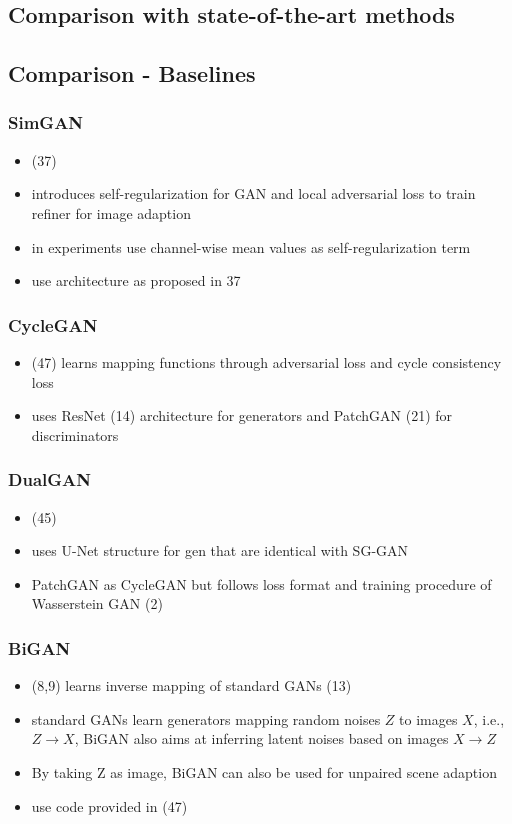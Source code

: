 \documentclass[]{article}
\begin{document}
\subsection{Comparison with state-of-the-art methods}
\subsection{Comparison - Baselines}
\subsubsection{SimGAN}
\begin{itemize}
	\item (37)
	\item introduces self-regularization for GAN and local adversarial loss to train refiner for image adaption
	\item in experiments use channel-wise mean values as self-regularization term
	\item use architecture as proposed in 37
\end{itemize}

\subsubsection{CycleGAN}
\begin{itemize}
	\item (47) learns mapping functions through adversarial loss and cycle consistency loss
	\item uses ResNet (14) architecture for generators and PatchGAN (21) for discriminators
\end{itemize}

\subsubsection{DualGAN}
\begin{itemize}
	\item (45)
	\item uses U-Net structure for gen that are identical with SG-GAN
	\item PatchGAN as CycleGAN but follows loss format and training procedure of Wasserstein GAN (2)
\end{itemize}

\subsubsection{BiGAN}
\begin{itemize}
	\item (8,9) learns inverse mapping of standard GANs (13)
	\item standard GANs learn generators mapping random noises $Z$ to images $X$, i.e., $Z \rightarrow X$, BiGAN also aims at inferring latent noises based on images $X\rightarrow Z$
	\item By taking Z as image, BiGAN can also be used for unpaired scene adaption
	\item use code provided in (47)
\end{itemize}
\end{document}
